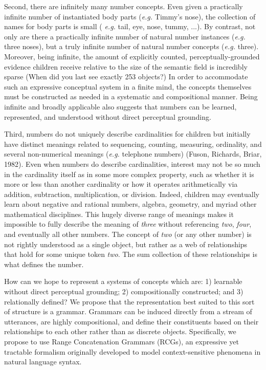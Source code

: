 \documentclass[10pt,letterpaper]{article}
\begin{document}

Second, there are infinitely many number concepts. Even given a
practically infinite number of instantiated body parts ({\it e.g.}
Timmy's nose), the collection of names for body parts is small ({\it
  e.g.} tail, eye, nose, tummy, ...). By contrast, not only are there
a practically infinite number of natural number instances ({\it e.g.}
three noses), but a truly infinite number of natural number concepts
({\it e.g.} three). Moreover, being infinite, the amount of explicitly
counted, perceptually-grounded evidence children receive relative to
the size of the semantic field is incredibly sparse (When did you last
see exactly 253 objects?) In order to accommodate such an expressive
conceptual system in a finite mind, the concepts themselves must be
constructed as needed in a systematic and compositional manner.
Being infinite and broadly applicable also suggests that numbers can
be learned, represented, and understood without direct perceptual
grounding.

Third, numbers do not uniquely describe cardinalities for children but
initially have distinct meanings related to sequencing, counting,
measuring, ordinality, and several non-numerical meanings ({\it e.g.}
telephone numbers) (Fuson, Richards, Briar, 1982). Even when numbers
do describe cardinalities, interest may not be so much in the
cardinality itself as in some more complex property, such as whether
it is more or less than another cardinality or how it operates
arithmetically via addition, subtraction, multiplication, or division.
Indeed, children may eventually learn about negative and rational
numbers, algebra, geometry, and myriad other mathematical disciplines.
This hugely diverse range of meanings makes it impossible to fully
describe the meaning of \emph{three} without referencing \emph{two},
\emph{four}, and eventually all other numbers. The concept of
\emph{two} (or any other number) is not rightly understood as a single
object, but rather as a web of relationships that hold for some unique
token \emph{two}. The sum collection of these relationships is what
defines the number.

How can we hope to represent a systems of concepts which are: 1)
learnable without direct perceptual grounding; 2) compositionally
constructed; and 3) relationally defined? We propose that the
representation best suited to this sort of structure is a
grammar. Grammars can be induced directly from a stream of utterances,
are highly compositional, and define their constituents based on their
relationships to each other rather than as discrete
objects. Specifically, we propose to use Range Concatenation Grammars (RCGs),
an expressive yet tractable formalism originally developed to model
context-sensitive phenomena in natural language syntax.
\end{document}
